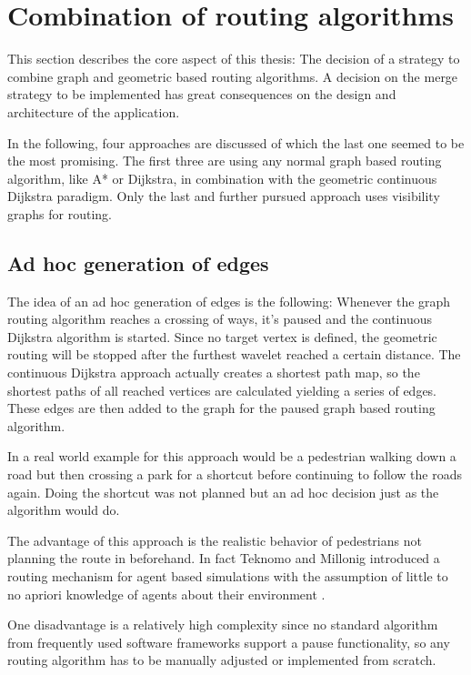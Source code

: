 \section{Combination of routing algorithms}
\label{sec:combining-routing-algorithms}

	This section describes the core aspect of this thesis:
	The decision of a strategy to combine graph and geometric based routing algorithms.
	A decision on the merge strategy to be implemented has great consequences on the design and architecture of the application.
	
	In the following, four approaches are discussed of which the last one seemed to be the most promising.
	The first three are using any normal graph based routing algorithm, like A* or Dijkstra, in combination with the geometric continuous Dijkstra paradigm.
	Only the last and further pursued approach uses visibility graphs for routing.
	
	\subsection{Ad hoc generation of edges}
	
		The idea of an ad hoc generation of edges is the following:
		Whenever the graph routing algorithm reaches a crossing of ways, it's paused and the continuous Dijkstra algorithm is started.
		Since no target vertex is defined, the geometric routing will be stopped after the furthest wavelet reached a certain distance.
		The continuous Dijkstra approach actually creates a shortest path map, so the shortest paths of all reached vertices are calculated yielding a series of edges.
		These edges are then added to the graph for the paused graph based routing algorithm.
		
		In a real world example for this approach would be a pedestrian walking down a road but then crossing a park for a shortcut before continuing to follow the roads again.
		Doing the shortcut was not planned but an ad hoc decision just as the algorithm would do.
		
		The advantage of this approach is the realistic behavior of pedestrians not planning the route in beforehand.
		In fact Teknomo and Millonig introduced a routing mechanism for agent based simulations with the assumption of little to no apriori knowledge of agents about their environment \cite{teknomo-millonig-routing}.
		
		One disadvantage is a relatively high complexity since no standard algorithm from frequently used software frameworks support a pause functionality, so any routing algorithm has to be manually adjusted or implemented from scratch.
		
